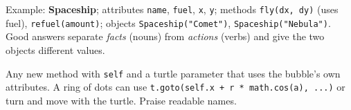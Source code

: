 \begin{answer}
Example: \textbf{Spaceship}; attributes \texttt{name}, \texttt{fuel}, \texttt{x}, \texttt{y}; methods \texttt{fly(dx, dy)} (uses fuel), \texttt{refuel(amount)}; objects \texttt{Spaceship("Comet")}, \texttt{Spaceship("Nebula")}.
Good answers separate \emph{facts} (nouns) from \emph{actions} (verbs) and give the two objects different values.
\end{answer}

\begin{answer}
Any new method with \texttt{self} and a turtle parameter that uses the bubble's own attributes. A ring of dots can use \texttt{t.goto(self.x + r * math.cos(a), ...)} or turn and move with the turtle. Praise readable names.
\end{answer}

